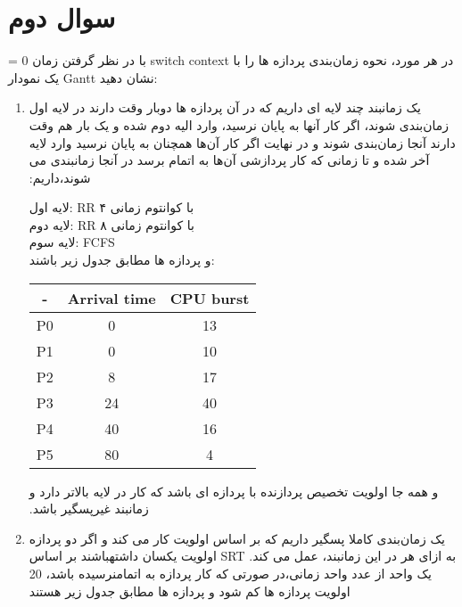 \section{سوال دوم}

‫با‬ ‫در‬ ‫نظر‬ ‫گرفتن‬ ‫زمان 0 =‬ switch context در هر مورد، ‫نحوه‬ ‫زمان‌بندی‬ ‫پردازه‬ ‫ها‬ ‫را‬ ‫با‬ ‫یک‬ ‫نمودار‬
Gantt نشان دهید:

\begin{enumerate}
	\item ‫یک‬ ‫زمانبند‬ ‫چند‬ ‫لایه‬ ‫ای‬ ‫داریم‬ ‫که‬ ‫در‬ ‫آن‬ ‫پردازه‬ ‫ها‬ ‫دوبار‬ ‫وقت‬ ‫دارند‬ ‫در‬ ‫لایه‬ ‫اول‬ ‫زمان‌بندی‬ ‫شوند‪ ،‬اگر‬ ‫کار‬ ‫آنها‬ ‫به پایان نرسید، ‫وارد‬ ‫الیه‬ ‫دوم‬ ‫شده‬ ‫و‬ ‫یک‬ ‫بار‬ ‫هم‬ ‫وقت‬ ‫دارند‬ ‫آنجا‬ ‫زمان‌بندی‬ ‫شوند‬ ‫و‬ ‫در‬ ‫نهایت‬ ‫اگر‬ ‫کار‬ ‫آن‌ها‬ ‫همچنان‬ ‫به‬ ‫پایان‬‬ ‫نرسید‬‫ وارد‬ ‫لایه‬ ‫آخر‬ ‫شده‬ ‫و‬ ‫تا‬ ‫زمانی‬ ‫که‬ ‫کار‬ ‫پردازشی‬ ‫آن‌ها‬ ‫به‬ ‫اتمام‬ ‫برسد‬ ‫در‬ ‫آنجا‬ ‫زمانبندی‬ ‫می‬ ‫شوند‪،‬داریم‪:‬‬
	
	لایه اول: RR با کوانتوم زمانی ۴\\
	لایه دوم: ‌RR با کوانتوم زمانی ۸\\
	لایه سوم: FCFS\\
	و پردازه ها مطابق جدول زیر باشند:

\begin{latin}
	\begin{center}
		\begin{tabular}{||c| c c||} 
			\hline
			- & Arrival time & ‫‪CPU burst \\ [0.5ex] 
			\hline\hline
			P0 & 0 & 13 \\ 
			\hline
			P1 & 0 & 10 \\ 
			\hline
			P2 & 8 & 17 \\
			\hline
			P3 & 24 & 40 \\
			\hline
			P4 & 40 & 16 \\
			\hline
			P5 & 80 & 4 \\ [1ex] 
			\hline
		\end{tabular}
	\end{center}
\end{latin}

‫و‬‫ همه‬ ‫جا‬ ‫اولویت‬ ‫تخصیص‬ ‫پردازنده‬ ‫با‬ ‫پردازه‬ ‫ای‬ ‫باشد‬ ‫که‬ ‫کار‬ ‫در‬ ‫لایه‬ ‫بالاتر‬ ‫دارد‬ ‫و‬ ‫زمانبند‬ ‫غیرپسگیر باشد.


	\item یک زمان‌بندی کاملا پسگیر داریم که ‫بر‬ ‫اساس‬ ‫اولویت‬ ‫کار‬ ‫می‬ ‫کند‬ ‫و‬ ‫اگر‬ ‫دو‬ ‫پردازه‬ ‫اولویت‬ ‫یکسان‬ ‫داشته‬‫باشند‬ ‫بر‬ ‫اساس‬ ‫‪SRT‬‬ ‫عمل‬ ‫می‬ ‫کند‪.‬‬ ‫در‬ ‫این‬ ‫زمانبند‪،‬‬ ‫به‬ ‫ازای‬ ‫هر‬ ‫‪20‬‬ ‫واحد‬ ‫زمانی‪،‬در‬ ‫صورتی‬ ‫که‬ ‫کار‬ ‫پردازه‬ ‫به‬ ‫اتمام‬‫نرسیده‬ ‫باشد‪،‬‬ ‫یک‬ ‫واحد‬ ‫از‬ ‫عدد‬ ‫اولویت‬ ‫پردازه‬ ‫ها‬ ‫کم‬ ‫شود‬ ‫و‬ ‫پردازه‬ ‫ها‬ ‫مطابق‬ ‫جدول‬ ‫زیر‬ ‫هستند‬‬
	

\end{enumerate}
